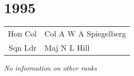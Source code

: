 \chapter*{1995}

\begin{center}
  \small
  \begin{tabular}{rl}
    Hon Col & Col A W A Spiegelberg \\
    Sqn Ldr & Maj N L Hill \\
  \end{tabular}
\end{center}

\begin{center}
  \textit{No information on other ranks}
\end{center}

\vspace{50mm}

\pagebreak
